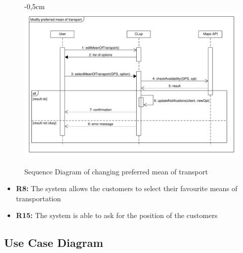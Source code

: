 \documentclass{article}
\begin{document}
\begin{center}
\begin{adjustwidth}{-1.5cm}{}
\begin{tabular}[h!]{|m{7.5em}|m{27.5em}|}
						\end{tabular}
					\end{adjustwidth}
					
					\begin{figure}[!htb]
						\begin{adjustwidth} {-0,5cm}{}
							\centering
							\includegraphics[scale=0.42]{SD/12_selectPreferredMeanOfTransport.pdf}\\
							\caption{Sequence Diagram of changing preferred mean of transport}
						\end{adjustwidth}

					\end{figure}
					
					
					\begin{itemize}
						\medskip
						\newpage
						{\bfseries Required functional requirements: }
						
						
						\item {\bfseries R8: } The system allows the customers to select their favourite means of transportation
						\item {\bfseries R15: } The system is able to ask for the position of the customers
											
						
					\end{itemize}
				\end{center}
		
		\subsection{Use Case Diagram}
		
\end{document}

